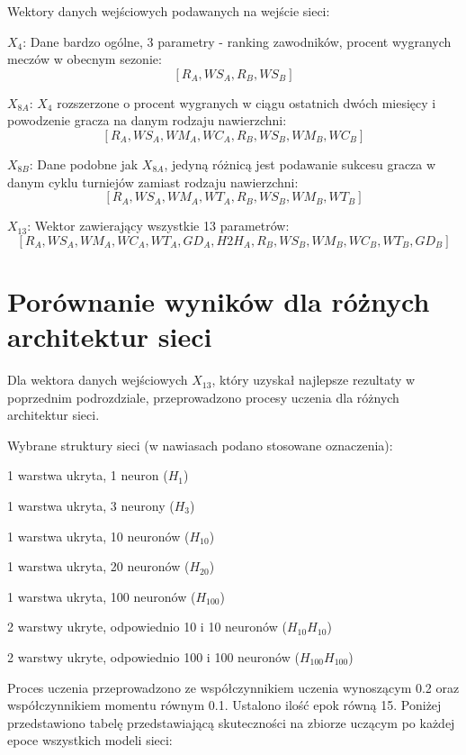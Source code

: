Wektory danych wejściowych podawanych na wejście sieci:
\begin{tightitemize}
\item $X_4$: Dane bardzo ogólne, 3 parametry - ranking zawodników, procent wygranych meczów w obecnym sezonie:
$$[R_A, WS_A, R_B, WS_B]$$
\item $X_{8A}$: $X_{4}$ rozszerzone o procent wygranych w ciągu ostatnich dwóch miesięcy i powodzenie gracza na danym rodzaju nawierzchni:
$$[R_A, WS_A, WM_A, WC_A, R_B, WS_B, WM_B, WC_B]$$
\item $X_{8B}$: Dane podobne jak $X_{8A}$, jedyną różnicą jest podawanie sukcesu gracza w danym cyklu turniejów zamiast rodzaju nawierzchni:
$$[R_A, WS_A, WM_A, WT_A, R_B, WS_B, WM_B, WT_B]$$
\item $X_{13}$: Wektor zawierający wszystkie 13 parametrów:
$$[R_A, WS_A, WM_A, WC_A, WT_A, GD_A,H2H_A,R_B, WS_B, WM_B, WC_B, WT_B, GD_B]$$
\end{tightitemize}

\section{Porównanie wyników dla różnych architektur sieci}
\label{Sec:VsArch}
Dla wektora danych wejściowych $X_{13}$, który uzyskał najlepsze rezultaty w poprzednim podrozdziale, przeprowadzono procesy uczenia dla różnych architektur sieci. 

Wybrane struktury sieci (w nawiasach podano stosowane oznaczenia):
\begin{tightitemize}
\item 1 warstwa ukryta, 1 neuron ($H_{1}$)
\item 1 warstwa ukryta, 3 neurony ($H_{3}$)
\item 1 warstwa ukryta, 10 neuronów ($H_{10}$)
\item 1 warstwa ukryta, 20 neuronów ($H_{20}$)
\item 1 warstwa ukryta, 100 neuronów ($H_{100}$)
\item 2 warstwy ukryte, odpowiednio 10 i 10 neuronów ($H_{10}H_{10}$)
\item 2 warstwy ukryte, odpowiednio 100 i 100 neuronów ($H_{100}H_{100}$)
\end{tightitemize}

Proces uczenia przeprowadzono ze współczynnikiem uczenia wynoszącym 0.2 oraz współczynnikiem momentu równym 0.1. Ustalono ilość epok równą 15. Poniżej przedstawiono tabelę przedstawiającą skuteczności na zbiorze uczącym po każdej epoce wszystkich modeli sieci:

